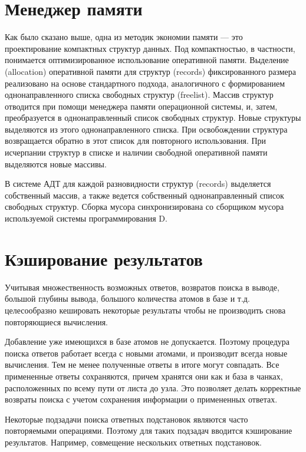 \section{Менеджер памяти}

Как было сказано выше, одна из методик экономии памяти --- это проектирование компактных структур данных. Под компактностью, в частности, понимается оптимизированное использование оперативной памяти. Выделение (allocation) оперативной памяти для структур (records) фиксированного размера реализовано на основе стандартного подхода, аналогичного \cite{gmemory} с формированием однонаправленного списка свободных структур (freelist). Массив структур отводится при помощи менеджера памяти операционной системы, и, затем, преобразуется в однонаправленный список свободных структур. Новые структуры выделяются из этого однонаправленного списка. При освобождении структура возвращается обратно в этот список для повторного использования. При исчерпании структур в списке и наличии свободной оперативной памяти выделяются новые массивы.

В системе АДТ для каждой разновидности структур (records) выделяется собственный массив, а также ведется собственный однонаправленный список свободных структур. Сборка мусора синхронизирована со сборщиком мусора используемой системы программирования D.


\section{Кэширование результатов}
Учитывая множественность возможных ответов, возвратов поиска в выводе, большой глубины вывода, большого количества атомов в базе и т.д. целесообразно кешировать некоторые результаты чтобы не производить снова повторяющиеся вычисления.

Добавление уже имеющихся в базе атомов не допускается. Поэтому процедура поиска ответов работает всегда с новыми атомами, и производит всегда новые вычисления. Тем не менее полученные ответы в итоге могут совпадать. Все примененные ответы сохраняются, причем хранятся они как и база в чанках, расположенных по всему пути от листа до узла. Это позволяет делать корректные возвраты поиска с учетом сохранения информации о примененных ответах.

Некоторые подзадачи поиска ответных подстановок являются часто повторяемыми операциями. Поэтому для таких подзадач вводится кэширование результатов. Например, совмещение нескольких ответных подстановок.




